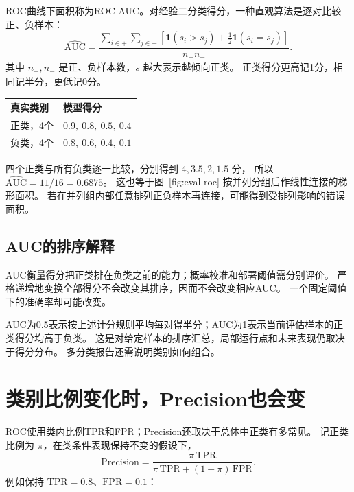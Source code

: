 ROC曲线下面积称为ROC-AUC。对经验二分类得分，一种直观算法是逐对比较正、负样本：
\begin{equation}
 \widehat{\mathrm{AUC}}=
 \frac{\displaystyle\sum_{i\in+}\sum_{j\in-}
 [\mathbf1(s_i>s_j)+\tfrac12\mathbf1(s_i=s_j)]}{n_+n_-}.
 \label{eq:eval-auc}
\end{equation}
其中 $n_+,n_-$ 是正、负样本数，$s$ 越大表示越倾向正类。
正类得分更高记1分，相同记半分，更低记0分。

\begin{center}
\small
\begin{tabularx}{.9\textwidth}{P{32mm}Y}
\toprule
真实类别 & 模型得分\\
\midrule
正类，4个 & $0.9,\ 0.8,\ 0.5,\ 0.4$\\
负类，4个 & $0.8,\ 0.6,\ 0.4,\ 0.1$\\
\bottomrule
\end{tabularx}
\end{center}

四个正类与所有负类逐一比较，分别得到 $4,3.5,2,1.5$ 分，
所以 $\widehat{\mathrm{AUC}}=11/16=0.6875$。
这也等于图~\ref{fig:eval-roc} 按并列分组后作线性连接的梯形面积。
若在并列组内部任意排列正负样本再连接，可能得到受排列影响的错误面积。

\subsection{AUC的排序解释}
AUC衡量得分把正类排在负类之前的能力；概率校准和部署阈值需分别评价。
严格递增地变换全部得分不会改变其排序，因而不会改变相应AUC。
一个固定阈值下的准确率却可能改变。

AUC为0.5表示按上述计分规则平均每对得半分；AUC为1表示当前评估样本的正类得分均高于负类。
这是对给定样本的排序汇总，局部运行点和未来表现仍取决于得分分布。
多分类报告还需说明类别如何组合。

\section{类别比例变化时，Precision也会变}
\label{sec:eval-prevalence}

ROC使用类内比例TPR和FPR；Precision还取决于总体中正类有多常见。
记正类比例为 $\pi$，在类条件表现保持不变的假设下，
\begin{equation}
 \mathrm{Precision}=
 \frac{\pi\,\mathrm{TPR}}
 {\pi\,\mathrm{TPR}+(1-\pi)\,\mathrm{FPR}}.
 \label{eq:eval-prior}
\end{equation}
例如保持 $\mathrm{TPR}=0.8$、$\mathrm{FPR}=0.1$：

